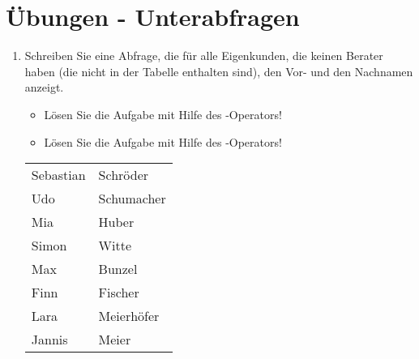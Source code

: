 \clearpage
    \section{Übungen - Unterabfragen}
      \begin{enumerate}
        \item Schreiben Sie eine Abfrage, die für alle Eigenkunden, die keinen
        Berater haben (die nicht in der Tabelle
         enthalten sind), den Vor- und den
        Nachnamen anzeigt.
        \begin{itemize}
          \item Lösen Sie die Aufgabe mit Hilfe des -Operators!
          \item Lösen Sie die Aufgabe mit Hilfe des -Operators!
        \end{itemize}
        \begin{center}
          \begin{small}
            \tablehead{}
            \begin{msoraclesql}
              \begin{supertabular}{ll}
                Sebastian & Schröder \\
                Udo & Schumacher \\
                Mia & Huber \\
                Simon & Witte \\
                Max & Bunzel \\
                Finn & Fischer \\
                Lara & Meierhöfer \\
                Jannis & Meier \\
              \end{supertabular}
            \end{msoraclesql}
          \end{small}
        \end{center}

\end{enumerate}
